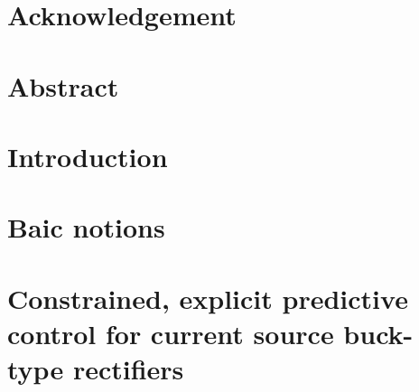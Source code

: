 \documentclass[12pt, a4paper, oneside, table]{report}
\begin{document}

 \null
 \thispagestyle{empty}%
 \addtocounter{page}{-1}%
 \newpage

 

 

 \chapter*{Acknowledgement}
 

% 

 \chapter*{Abstract}
 

 \thispagestyle{plain}
 \tableofcontents
 \newpage

\chapter{Introduction}
 
 
 

 

 \chapter{Baic notions}

 
 

 \chapter{Constrained, explicit predictive control for current source buck-type rectifiers}
 
\end{document}

